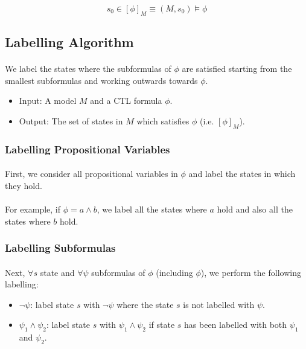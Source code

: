 \documentclass{article}
\theoremstyle{plain}
\theoremstyle{definition}
\begin{document}
\begin{multicols}{2}
$$s_0 \in [\phi]_M \equiv (M, s_0) \models \phi$$

\subsection{Labelling Algorithm}\label{sec:LabellingAlgorithm}

\paragraph{} We label the states where the subformulas of $\phi$ are satisfied starting from the smallest subformulas and working outwards towards $\phi$. 

\begin{itemize}
\item Input: A model $M$ and a CTL formula $\phi$.
\item Output: The set of states in $M$ which satisfies $\phi$ (i.e. $[\phi]_M$).
\end{itemize}

\subsubsection{Labelling Propositional Variables}

\paragraph{} First, we consider all propositional variables in $\phi$ and label the states in which they hold. 

\paragraph{} For example, if $\phi = a \land b$, we label all the states where $a$ hold and also all the states where $b$ hold.

\subsubsection{Labelling Subformulas}

\paragraph{} Next, $\forall s$ state and $\forall\psi$ subformulas of $\phi$ (including $\phi$), we perform the following labelling:

\begin{itemize}
\item $\lnot\psi$: label state $s$ with $\lnot\psi$ where the state $s$ is not labelled with $\psi$.
\item $\psi_1 \land \psi_2$: label state $s$ with $\psi_1 \land \psi_2$ if state $s$ has been labelled with both $\psi_1$ and $\psi_2$.
\end{itemize}


\end{multicols}
\end{document}
